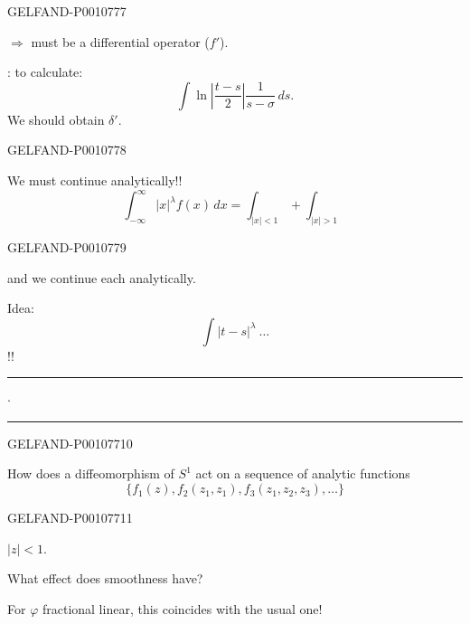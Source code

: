 \begin{GelfandAdjacentEvidence}{GELFAND-P001077}{7}



$\Rightarrow$ must be a differential operator ($f'$).

: to calculate:
\begin{equation*}
\int\ln\left|\frac{t-s}{2}\right|\frac{1}{s-\sigma}\,ds.
\end{equation*}
We should obtain $\delta'$.
\end{GelfandAdjacentEvidence}
\begin{GelfandAdjacentEvidence}{GELFAND-P001077}{8}


We must continue analytically!!
\begin{equation*}
\int_{-\infty}^{\infty}|x|^\lambda f(x)\,dx
=\int_{|x|<1}+\int_{|x|>1}
\end{equation*}
\end{GelfandAdjacentEvidence}
\begin{GelfandAdjacentEvidence}{GELFAND-P001077}{9}

and we continue each analytically.

Idea:
\begin{equation*}
\int|t-s|^\lambda\ \ldots
\end{equation*}
!!

\begin{center}\rule{1.55em}{.45pt}\enspace\(\cdot\)\enspace\rule{1.55em}{.45pt}\end{center}
\end{GelfandAdjacentEvidence}
\begin{GelfandAdjacentEvidence}{GELFAND-P001077}{10}


How does a diffeomorphism of $S^1$ act on a sequence of analytic functions
\begin{equation*}
\{f_1(z),f_2(z_1,z_1),f_3(z_1,z_2,z_3),\ldots\}
\end{equation*}
\end{GelfandAdjacentEvidence}
\begin{GelfandAdjacentEvidence}{GELFAND-P001077}{11}

$|z|<1$.

What effect does smoothness have?

For $\varphi$ fractional linear, this coincides with the usual one!
\end{GelfandAdjacentEvidence}


